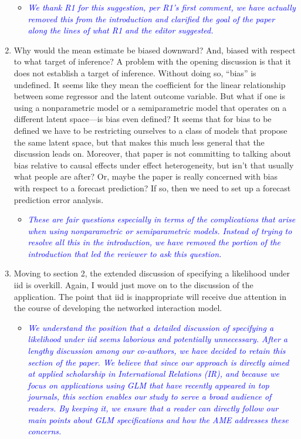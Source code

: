\begin{enumerate}
	\begin{itemize}
		\item  \emph{ \textcolor{blue}{
		We thank R1 for this suggestion, per R1's first comment, we have actually removed this from the introduction and clarified the goal of the paper along the lines of what R1 and the editor suggested.
		}}
	\end{itemize}
	\item Why would the mean estimate be biased downward?  And, biased with respect to what target of inference?  A problem with the opening discussion is that it does not establish a target of inference.  Without doing so, ``bias'' is undefined.  It seems like they mean the coefficient for the linear relationship between some regressor and the latent outcome variable. But what if one is using a nonparametric model or a semiparametric model that operates on a different latent space---is bias even defined?  It seems that for bias to be defined we have to be restricting ourselves to a class of models that propose the same latent space, but that makes this much less general that the discussion leads on.  Moreover, that paper is not committing to talking about bias relative to causal effects under effect heterogeneity, but isn't that usually what people are after?  Or, maybe the paper is really concerned with bias with respect to a forecast prediction? If so, then we need to set up a forecast prediction error analysis.
	\begin{itemize}
		\item  \emph{ \textcolor{blue}{
		These are fair questions especially in terms of the complications that arise when using nonparametric or semiparametric models. Instead of trying to resolve all this in the introduction, we have removed the portion of the introduction that led the reviewer to ask this question.
		}}
	\end{itemize}
	\item Moving to section 2, the extended discussion of specifying a likelihood under iid is overkill.  Again, I would just move on to the discussion of the application. The point that iid is inappropriate will receive due attention in the course of developing the networked interaction model.
	\begin{itemize}
		\item  \emph{ \textcolor{blue}{
		We understand the position that a detailed discussion of specifying a likelihood under iid seems laborious and potentially unnecessary. After a lengthy discussion among our co-authors, we have decided to retain this section of the paper. We believe that since our approach is directly aimed at applied scholarship in International Relations (IR), and because we focus on applications using GLM that have recently appeared in top journals, this section enables our study to serve a broad audience of readers. By keeping it, we ensure that a reader can directly follow our main points about GLM specifications and how the AME addresses these concerns. 
}}
\end{itemize}
\end{enumerate}
